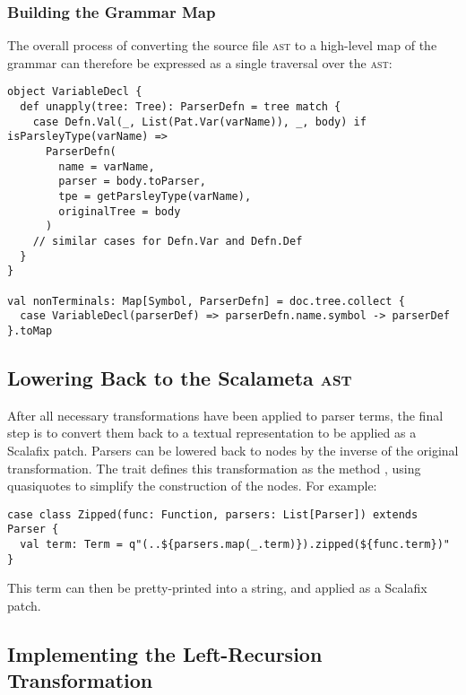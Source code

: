 \documentclass[../../main.tex]{subfiles}
\begin{document}
\subsubsection{Building the Grammar Map}
The overall process of converting the source file \textsc{ast} to a high-level map of the grammar can therefore be expressed as a single traversal over the \textsc{ast}:
\begin{verbatim}
object VariableDecl {
  def unapply(tree: Tree): ParserDefn = tree match {
    case Defn.Val(_, List(Pat.Var(varName)), _, body) if isParsleyType(varName) =>
      ParserDefn(
        name = varName,
        parser = body.toParser,
        tpe = getParsleyType(varName),
        originalTree = body
      )
    // similar cases for Defn.Var and Defn.Def
  }
}

val nonTerminals: Map[Symbol, ParserDefn] = doc.tree.collect {
  case VariableDecl(parserDef) => parserDefn.name.symbol -> parserDef
}.toMap
\end{verbatim}

\subsection{Lowering Back to the Scalameta \textsc{ast}}\label{sec:lowering-parsers}
After all necessary transformations have been applied to parser terms, the final step is to convert them back to a textual representation to be applied as a Scalafix patch.
Parsers can be lowered back to  nodes by the inverse of the original  transformation.
The  trait defines this transformation as the method , using quasiquotes to simplify the construction of the  nodes.
For example:
\begin{verbatim}
case class Zipped(func: Function, parsers: List[Parser]) extends Parser {
  val term: Term = q"(..${parsers.map(_.term)}).zipped(${func.term})"
}
\end{verbatim}
%
This term can then be pretty-printed into a string, and applied as a Scalafix patch.

\subsection{Implementing the Left-Recursion Transformation}
\end{document}
